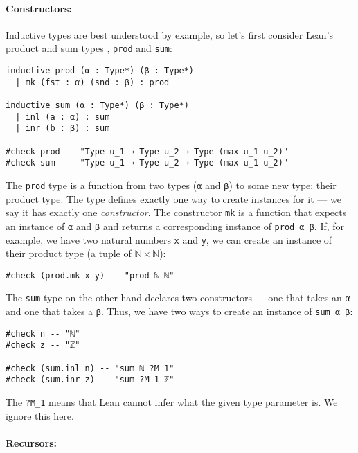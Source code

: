 \paragraph{Constructors:}

Inductive types are best understood by example, so let's first consider Lean's product and sum types \cite[p.~99]{leanbook}, \lstinline{prod} and \lstinline{sum}:

\begin{lstlisting}
inductive prod (α : Type*) (β : Type*)
  | mk (fst : α) (snd : β) : prod
  
inductive sum (α : Type*) (β : Type*)
  | inl (a : α) : sum
  | inr (b : β) : sum

#check prod -- "Type u_1 → Type u_2 → Type (max u_1 u_2)"
#check sum  -- "Type u_1 → Type u_2 → Type (max u_1 u_2)"
\end{lstlisting}

\noindent The \lstinline{prod} type is a function from two types (\lstinline{α} and \lstinline{β}) to some new type: their product type. 
The type defines exactly one way to create instances for it --- we say it has exactly one \emph{constructor}.
The constructor \lstinline{mk} is a function that expects an instance of \lstinline{α} and \lstinline{β} and returns a corresponding instance of \lstinline{prod α β}.
If, for example, we have two natural numbers \lstinline{x} and \lstinline{y}, we can create an instance of their product type (a tuple of $\mathbb{N} \times \mathbb{N}$):

\begin{lstlisting}
#check (prod.mk x y) -- "prod ℕ ℕ"
\end{lstlisting}

\noindent The \lstinline{sum} type on the other hand declares two constructors --- one that takes an \lstinline{α} and one that takes a \lstinline{β}.
Thus, we have two ways to create an instance of \lstinline{sum α β}:

\begin{lstlisting}
#check n -- "ℕ"
#check z -- "ℤ"

#check (sum.inl n) -- "sum ℕ ?M_1"
#check (sum.inr z) -- "sum ?M_1 ℤ"
\end{lstlisting}

\noindent The \lstinline{?M_1} means that Lean cannot infer what the given type parameter is. 
We ignore this here.

\paragraph{Recursors:}

